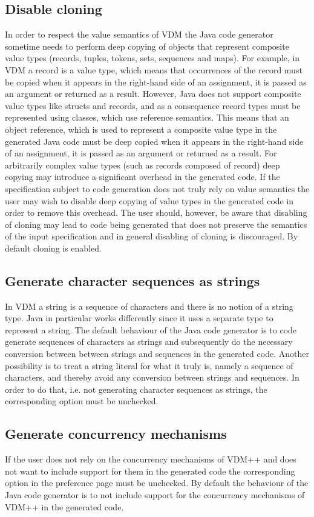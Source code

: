\subsection{Disable cloning}
In order to respect the value semantics of VDM the Java code generator sometime needs to perform
deep copying of objects that represent composite value types (records, tuples, tokens, sets,
sequences and maps). For example, in VDM a record is a value type, which means that occurrences
of the record must be copied when it appears in the right-hand side of an assignment, it is passed
as an argument or returned as a result. However, Java does not support composite value types like
structs and records, and as a consequence record types must be represented using classes, which
use reference semantics. This means that an object reference, which is used to represent a composite
value type in the generated Java code must be deep copied when it appears in the right-hand
side of an assignment, it is passed as an argument or returned as a result. For arbitrarily complex
value types (such as records composed of record) deep copying may
introduce a significant overhead in the generated code. If the specification subject to code generation
does not truly rely on value semantics the user may wish to disable deep copying of value
types in the generated code in order to remove this overhead. The user should, however, be aware
that disabling of cloning may lead to code being generated that does not preserve the semantics
of the input specification and in general disabling of cloning is discouraged. By default cloning is
enabled.

\subsection{Generate character sequences as strings}
In VDM a string is a sequence of characters and there is no notion of a string type. Java in particular
works differently since it uses a separate type to represent a string. The default behaviour of the
Java code generator is to code generate sequences of characters as strings and subsequently do
the necessary conversion between between strings and sequences in the generated code. Another
possibility is to treat a string literal for what it truly is, namely a sequence of characters, and
thereby avoid any conversion between strings and sequences. In order to do that, i.e. not generating
character sequences as strings, the corresponding option must be unchecked.

\subsection{Generate concurrency mechanisms}
If the user does not rely on the concurrency mechanisms of VDM++ and does not want to include
support for them in the generated code the corresponding option in the preference page must be
unchecked. By default the behaviour of the Java code generator is to not include support for the
concurrency mechanisms of VDM++ in the generated code.


